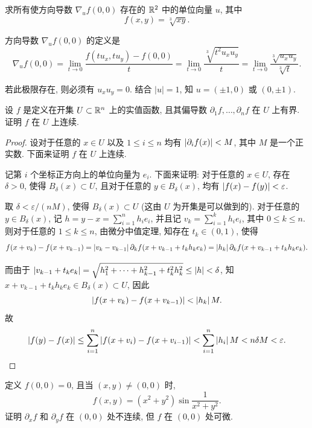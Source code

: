 \documentclass{article}
\begin{document}
\begin{problem}
  求所有使方向导数 $\nabla_u f(0,0)$ 存在的 $\mathbb{R}^2$ 中的单位向量 $u$, 其中
  \[
    f(x,y)=\sqrt[3]{xy}.
  \]
\end{problem}

\begin{solution}
	方向导数 $\nabla_uf(0,0)$ 的定义是
	\[ \nabla_uf(0,0) = \lim_{t \to 0} \frac{f(tu_x,tu_y) - f(0,0)}{t}
	= \lim_{t \to 0} \frac{\sqrt[3]{t^2u_xu_y}}{t} 
	= \lim_{t \to 0} \frac{\sqrt[3]{u_xu_y}}{\sqrt[3]{t}}. \]

	若此极限存在, 则必须有 $u_xu_y=0$. 结合 $|u| = 1$, 知 $u = (\pm 1,0)$ 或 $(0,\pm 1)$.
\end{solution}



\begin{problem}
  设 $f$ 是定义在开集 $U\subset\mathbb{R}^n$ 上的实值函数, 且其偏导数 $\partial_1 f,\ldots,\partial_n f$ 在 $U$ 上有界. 证明 $f$ 在 $U$ 上连续.
\end{problem}

\begin{proof}
	设对于任意的 $x \in U$ 以及 $1\le i\le n$ 均有 $\left|\partial_if(x)\right| < M$, 其中 $M$ 是一个正实数. 下面来证明 $f$ 在 $U$ 上连续.

	记第 $i$ 个坐标正方向上的单位向量为 $e_i$. 下面来证明: 对于任意的 $x\in U$, 存在 $\delta>0$, 使得 $B_{\delta}(x) \subset U$, 且对于任意的 $y \in B_\delta(x)$, 均有 $\left|f(x)-f(y)\right| < \varepsilon$.

	取 $\delta < \varepsilon/(nM)$, 使得 $B_\delta(x) \subset U$ (这由 $U$ 为开集是可以做到的). 对于任意的 $y\in B_\delta(x)$, 记 $h = y-x = \sum_{i=1}^{n}h_ie_i$, 并且记 $v_k = \sum_{i=1}^{k} h_ie_i$, 其中 $0\le k\le n$. 则对于任意的 $1\le k\le n$, 由微分中值定理, 知存在 $t_k \in (0,1)$, 使得
	\[ f(x+v_k) - f(x+v_{k-1}) = \left|v_k-v_{k-1}\right|\partial_kf(x+v_{k-1}+t_kh_ke_k) = \left|h_k\right| \partial_kf(x+v_{k-1}+t_kh_ke_k). \]

	而由于 $\left|v_{k-1}+t_ke_k\right| = \sqrt{h_1^2+\dots+h_{k-1}^2+t_k^2h_k^2} \le |h| <\delta$, 知 $x+v_{k-1}+t_kh_ke_k \in B_\delta(x) \subset U$, 因此
	\[ \left|f(x+v_k) - f(x+v_{k-1})\right| < \left|h_k\right| M. \]
	故
	\[ \left|f(y)-f(x)\right| \le \sum_{i=1}^{n} \left|f(x+v_{i})-f(x+v_{i-1})\right|
	< \sum_{i=1}^{n}\left|h_i\right| M < n\delta M < \varepsilon. \]
\end{proof}



\begin{problem}
  定义 $f(0,0)=0$, 且当 $(x,y)\ne(0,0)$ 时,
  \[
    f(x,y)=(x^2+y^2)\sin\frac{1}{x^2+y^2}.
  \]
  证明 $\partial_x f$ 和 $\partial_y f$ 在 $(0,0)$ 处不连续, 但 $f$ 在 $(0,0)$ 处可微.
\end{problem}
\end{document}
